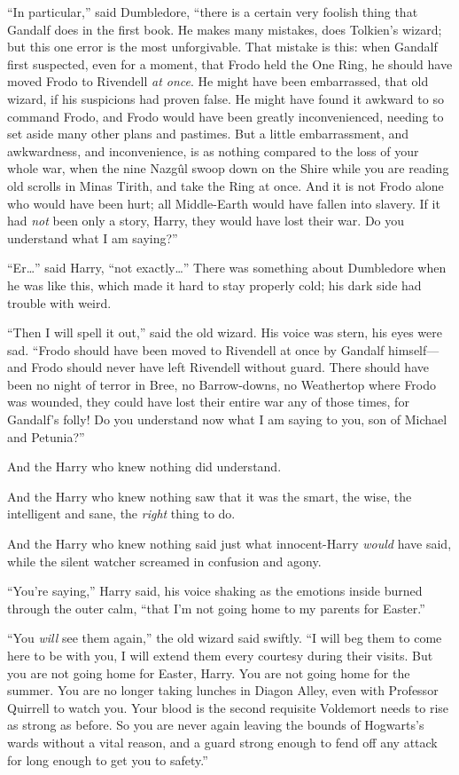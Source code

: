 “In particular,” said Dumbledore, “there is a certain very foolish thing that Gandalf does in the first book. He makes many mistakes, does Tolkien’s wizard; but this one error is the most unforgivable. That mistake is this: when Gandalf first suspected, even for a moment, that Frodo held the One Ring, he should have moved Frodo to Rivendell \emph{at once}. He might have been embarrassed, that old wizard, if his suspicions had proven false. He might have found it awkward to so command Frodo, and Frodo would have been greatly inconvenienced, needing to set aside many other plans and pastimes. But a little embarrassment, and awkwardness, and inconvenience, is as nothing compared to the loss of your whole war, when the nine Nazgûl swoop down on the Shire while you are reading old scrolls in Minas Tirith, and take the Ring at once. And it is not Frodo alone who would have been hurt; all Middle-Earth would have fallen into slavery. If it had \emph{not} been only a story, Harry, they would have lost their war. Do you understand what I am saying?”

“Er…” said Harry, “not exactly…” There was something about Dumbledore when he was like this, which made it hard to stay properly cold; his dark side had trouble with weird.

“Then I will spell it out,” said the old wizard. His voice was stern, his eyes were sad. “Frodo should have been moved to Rivendell at once by Gandalf himself—and Frodo should never have left Rivendell without guard. There should have been no night of terror in Bree, no Barrow-downs, no Weathertop where Frodo was wounded, they could have lost their entire war any of those times, for Gandalf’s folly! Do you understand now what I am saying to you, son of Michael and Petunia?”

And the Harry who knew nothing did understand.

And the Harry who knew nothing saw that it was the smart, the wise, the intelligent and sane, the \emph{right} thing to do.

And the Harry who knew nothing said just what innocent-Harry \emph{would} have said, while the silent watcher screamed in confusion and agony.

“You’re saying,” Harry said, his voice shaking as the emotions inside burned through the outer calm, “that I’m not going home to my parents for Easter.”

“You \emph{will} see them again,” the old wizard said swiftly. “I will beg them to come here to be with you, I will extend them every courtesy during their visits. But you are not going home for Easter, Harry. You are not going home for the summer. You are no longer taking lunches in Diagon Alley, even with Professor Quirrell to watch you. Your blood is the second requisite Voldemort needs to rise as strong as before. So you are never again leaving the bounds of Hogwarts’s wards without a vital reason, and a guard strong enough to fend off any attack for long enough to get you to safety.”

